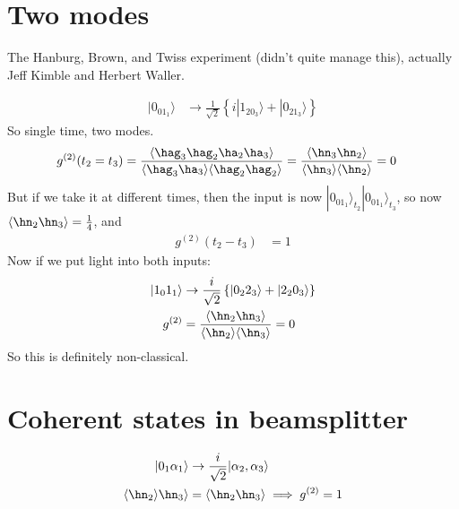 \documentclass[a4paper, 11pt, normalem]{report}
\begin{document}
\section{Two modes}
The Hanburg, Brown, and Twiss experiment (didn't quite manage this), actually Jeff Kimble and Herbert Waller. 
\begin{figure}[H]
    \centering
\end{figure}
\begin{align}
    |0_01_1\rangle &\to \frac{1}{\sqrt{2}}\left\{i|1_20_3\rangle + |0_21_3\rangle\right\}
\end{align}
So single time, two modes. 
\begin{align}
    g^{(2)}(t_2=t_3) &= \frac{\langle\hag_3\hag_2\ha_2\ha_3\rangle}{\langle\hag_3\ha_3\rangle\langle\hag_2\hag_2\rangle} = \frac{\langle\hn_3\hn_2\rangle}{\langle\hn_3\rangle\langle\hn_2\rangle} = 0 
\end{align}
But if we take it at different times, then the input is now $|0_01_1\rangle_{t_2}|0_01_1\rangle_{t_3}$, so now $\langle\hn_2\hn_3\rangle = \frac14$, and 
\begin{align}
    g^{(2)}(t_2-t_3) &= 1
\end{align}
Now if we put light into both inputs:
\begin{align}
    |1_01_1\rangle &\to \frac{i}{\sqrt{2}}\left\{|0_22_3\rangle + |2_20_3\rangle\right\} \\
    g^{(2)} &= \frac{\langle\hn_2\hn_3\rangle}{\langle\hn_2\rangle\langle\hn_3\rangle} = 0
\end{align}
So this is definitely non-classical.

\section{Coherent states in beamsplitter}
\begin{align}
    |0_1\alpha_1\rangle &\to \frac{i}{\sqrt{2}}|\alpha_2,\alpha_3\rangle \\
    \langle\hn_2\rangle\hn_3\rangle &= \langle\hn_2\hn_3\rangle \implies g^{(2)} = 1 
\end{align}
\end{document}
